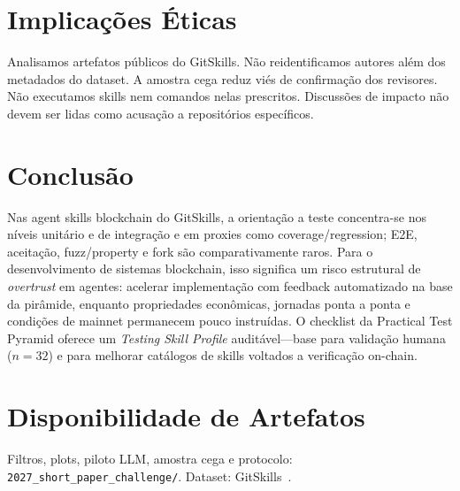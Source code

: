 \documentclass[10pt,conference]{IEEEtran}
\begin{document}
\section{Implicações Éticas}

Analisamos artefatos públicos do GitSkills.
Não reidentificamos autores além dos metadados do dataset.
A amostra cega reduz viés de confirmação dos revisores.
Não executamos skills nem comandos nelas prescritos.
Discussões de impacto não devem ser lidas como acusação a repositórios específicos.

\section{Conclusão}

Nas agent skills blockchain do GitSkills, a orientação a teste concentra-se nos níveis unitário e de integração e em proxies como coverage/regression; E2E, aceitação, fuzz/property e fork são comparativamente raros.
Para o desenvolvimento de sistemas blockchain, isso significa um risco estrutural de \emph{overtrust} em agentes: acelerar implementação com feedback automatizado na base da pirâmide, enquanto propriedades econômicas, jornadas ponta a ponta e condições de mainnet permanecem pouco instruídas.
O checklist da Practical Test Pyramid oferece um \emph{Testing Skill Profile} auditável---base para validação humana ($n{=}32$) e para melhorar catálogos de skills voltados a verificação on-chain.

\section*{Disponibilidade de Artefatos}

Filtros, plots, piloto LLM, amostra cega e protocolo: \texttt{2027\_short\_paper\_challenge/}. Dataset: GitSkills~\cite{gitskills2027}.



\end{document}
